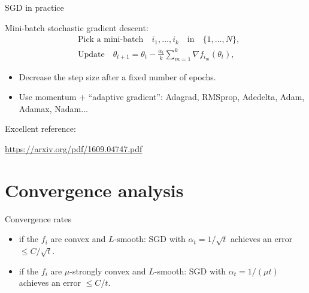 \documentclass{beamer}
\begin{document}
\begin{frame}[t]{SGD in practice}
	\grid
	\vspace{-0.6cm}
	\begin{exampleblock}{}
		Mini-batch stochastic gradient descent:
\begin{align*}
	&\text{Pick a mini-batch} \quad i_1, \dots, i_k \quad \text{in} \quad \{1, \dots, N\}, \\
	&\text{Update} \quad \theta_{t+1} = \theta_t - \frac{\alpha_t}{k}\sum_{m=1}^k \nabla f_{i_m}(\theta_t),
\end{align*}
	\end{exampleblock}

	\begin{itemize}
		\item Decrease the step size after a fixed number of epochs.
		\item Use momentum + ``adaptive gradient'': Adagrad, RMSprop, Adedelta, Adam, Adamax, Nadam...
	\end{itemize}
	\vspace{0.3cm}

	Excellent reference:
	\begin{center}
		\url{https://arxiv.org/pdf/1609.04747.pdf}
	\end{center}

\end{frame}


\section{Convergence analysis}

\begin{frame}[t]{Convergence rates}
	\grid

	\begin{exampleblock}{}
		\begin{itemize}
			\item if the $f_i$ are convex and $L$-smooth: SGD with $\alpha_t = 1 / \sqrt{t}$ achieves an error $\leq C / \sqrt{t}$.
			\item if the $f_i$ are $\mu$-strongly convex and $L$-smooth: SGD with $\alpha_t = 1 / (\mu t)$ achieves an error $\leq C / t$.
		\end{itemize}
	\end{exampleblock}

\end{frame}
\end{document}
